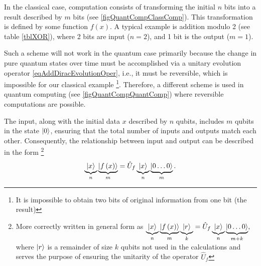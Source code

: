 

In the classical case, computation consists of transforming the initial $n$ bits into a result described by $m$ bits (see \autoref{figQuantCompClassComp}). This transformation is defined by some function $f\left(x\right)$. A typical example is addition modulo 2 (see table \ref{tblXOR}), where 2 bits are input ($n = 2$), and 1 bit is the output ($m = 1$).



Such a scheme will not work in the quantum case primarily because the change in pure quantum states over time must be accomplished via a unitary evolution operator \eqref{eqAddDiracEvolutionOper}, i.e., it must be reversible, which is impossible for our classical example \footnote{It is impossible to obtain two bits of original information from one bit (the result)}. Therefore, a different scheme is used in quantum computing (see \autoref{figQuantCompQuantComp}) where reversible computations are possible.

The input, along with the initial data $x$ described by $n$ qubits, includes $m$ qubits in the state $\ket{0}$, ensuring that the total number of inputs and outputs match each other. Consequently, the relationship between input and output can be described in the form
\footnote{More correctly written in general form as 
$
\underbrace{\ket{x}}_n
\underbrace{\left|f\left(x\right)\right>}_m
\underbrace{\ket{r}}_k = 
\hat{U}_f \underbrace{\ket{x}}_n
\underbrace{\left|0 \dots 0\right>}_{m+k},
$
where $\ket{r}$ is a remainder of size $k$ qubits not used in the calculations and serves the purpose of ensuring the unitarity of the operator $\hat{U}_f$
}
\begin{equation}
\underbrace{\ket{x}}_n
\underbrace{\left|f\left(x\right)\right>}_m = 
\hat{U}_f \underbrace{\ket{x}}_n\underbrace{\left|0 \dots
  0\right>}_m.
\label{eqQuantCompQuantComp}
\end{equation}